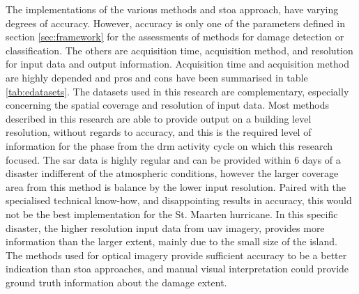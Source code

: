 \noindent The implementations of the various methods and \ac{stoa} approach, have varying degrees of accuracy. However, accuracy is only one of the parameters defined in section \ref{sec:framework} for the assessments of methods for damage detection or classification. The others are acquisition time, acquisition method, and resolution for input data and output information. Acquisition time and acquisition method are highly depended and pros and cons have been summarised in table \ref{tab:edatasets}. The datasets used in this research are complementary, especially concerning the spatial coverage and resolution of input data. Most methods described in this research are able to provide output on a building level resolution, without regards to accuracy, and this is the required level of information for the phase from the \ac{drm} activity cycle on which this research focused. The \ac{sar} data is highly regular and can be provided within 6 days of a disaster indifferent of the atmospheric conditions, however the larger coverage area from this method is balance by the lower input resolution. Paired with the specialised technical know-how, and disappointing results in accuracy, this would not be the best implementation for the St. Maarten hurricane. In this specific disaster, the higher resolution input data from \ac{uav} imagery, provides more information than the larger extent, mainly due to the small size of the island. The methods used for optical imagery provide sufficient accuracy to be a better indication than \ac{stoa} approaches, and manual visual interpretation could provide ground truth information about the damage extent. 